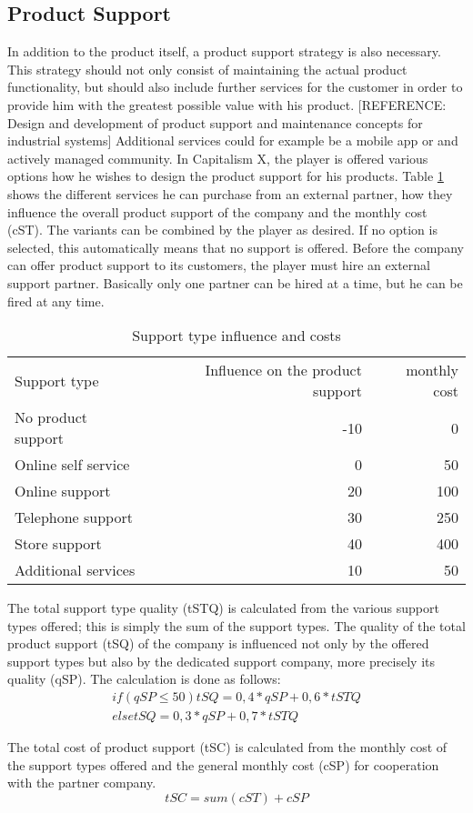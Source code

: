 \subsection{Product Support}  \label{product_support_simulation}
In addition to the product itself, a product support strategy is also necessary. This strategy should not only consist of maintaining the actual product functionality, but should also include further services for the customer in order to provide him with the greatest possible value with his product. [REFERENCE: Design and development of product support and maintenance concepts for industrial systems] Additional services could for example be a mobile app or and actively managed community.  
In Capitalism X, the player is offered various options how he wishes to design the product support for his products. Table \ref{Support_types} shows the different services he can purchase from an external partner, how they influence the overall product support of the company and the monthly cost (cST). The variants can be combined by the player as desired. If no option is selected, this automatically means that no support is offered.
Before the company can offer product support to its customers, the player must hire an external support partner. Basically only one partner can be hired at a time, but he can be fired at any time.

\begin{table}[ht]
    \centering
    \begin{tabular}{|l|r|r|}
    \hline
    Support type & Influence on the product support & monthly cost \\
    No product support   & -10   & 0    \\
    Online self service  & 0     & 50   \\
    Online support       & 20    & 100  \\
    Telephone support    & 30    & 250  \\
    Store support        & 40    & 400  \\
    Additional services  & 10    & 50   \\     
    \hline
    \end{tabular}
    \caption{Support type influence and costs}
    \label{Support_types}
\end{table}

The total support type quality (tSTQ) is calculated from the various support types offered; this is simply the sum of the support types. The quality of the total product support (tSQ) of the company is influenced not only by the offered support types but also by the dedicated support company, more precisely its quality (qSP). The calculation is done as follows:
\begin{equation}
\begin{aligned}
    if ( qSP ≤ 50 ) tSQ = { 0,4 *qSP + 0,6 * tSTQ } \\
    else tSQ = { 0,3 * qSP + 0,7 * tSTQ }
\end{aligned}
\end{equation}

The total cost of product support (tSC) is calculated from the monthly cost of the support types offered and the general monthly cost (cSP) for cooperation with the partner company.
\begin{equation}
    tSC = sum (cST) + cSP
\end{equation}